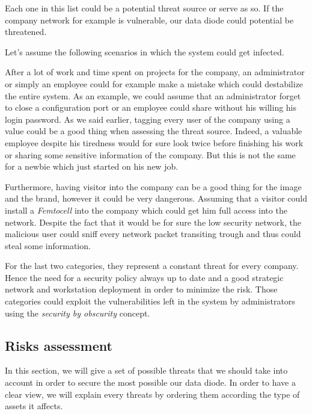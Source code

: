 \documentclass[a4paper,10pt]{article}
\begin{document}
Each one in this list could be a potential threat source or serve as so. If the company network for example is vulnerable, our data diode could potential be threatened.

Let's assume the following scenarios in which the system could get infected.

After a lot of work and time spent on projects for the company, an administrator or simply an employee could for example make a mistake which could destabilize the entire system. As an example, we could assume that an administrator forget to close a configuration port or an employee could share without his willing his login password.
As we said earlier, tagging every user of the company using a value could be a good thing when assessing the threat source. Indeed, a valuable employee despite his tiredness would for sure look twice before finishing his work or sharing some sensitive information of the company. But this is not the same for a newbie which just started on his new job.

Furthermore, having visitor into the company can be a good thing for the image and the brand, however it could be very dangerous. Assuming that a visitor could install a \emph{Femtocell} into the company which could get him full access into the network. Despite the fact that it would be for sure the low security network, the malicious user could sniff every network packet transiting trough and thus could steal some information.

For the last two categories, they represent a constant threat for every company. Hence the need for a security policy always up to date and a good strategic network and workstation deployment in order to minimize the risk. Those categories could exploit the vulnerabilities left in the system by administrators using the \emph{security by obscurity} concept.

\subsection{Risks assessment}
In this section, we will give a set of possible threats that we should take into account in order to secure the most possible our data diode. In order to have a clear view, we will explain every threats by ordering them according the type of assets it affects.
\end{document}
